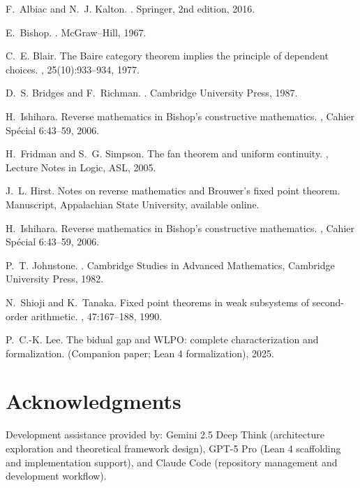 \documentclass[11pt]{article}
\theoremstyle{definition}
\theoremstyle{remark}
\begin{document}
\bigskip


\begin{thebibliography}{10}

F.~Albiac and N.~J. Kalton.
.
\newblock Springer, 2nd edition, 2016.

E.~Bishop.
.
\newblock McGraw--Hill, 1967.

C.~E. Blair.
\newblock The {B}aire category theorem implies the principle of dependent choices.
, 25(10):933--934, 1977.

D.~S. Bridges and F.~Richman.
.
\newblock Cambridge University Press, 1987.

H.~Ishihara.
\newblock Reverse mathematics in {B}ishop's constructive mathematics.
, Cahier Sp\'ecial 6:43--59, 2006.


H.~Fridman and S.~G. Simpson.
\newblock The fan theorem and uniform continuity.
, Lecture Notes in Logic, ASL, 2005.

J.~L. Hirst.
\newblock Notes on reverse mathematics and {B}rouwer's fixed point theorem.
\newblock Manuscript, Appalachian State University, available online.

H.~Ishihara.
\newblock Reverse mathematics in {B}ishop's constructive mathematics.
, Cahier Sp\'ecial 6:43--59, 2006.

P.~T. Johnstone.
.
\newblock Cambridge Studies in Advanced Mathematics, Cambridge University Press, 1982.

N.~Shioji and K.~Tanaka.
\newblock Fixed point theorems in weak subsystems of second-order arithmetic.
, 47:167--188, 1990.

P.~C.-K. Lee.
\newblock The bidual gap and {WLPO}: complete characterization and
  formalization.
\newblock (Companion paper; Lean 4 formalization), 2025.

\end{thebibliography}






\section*{Acknowledgments}
Development assistance provided by: Gemini 2.5 Deep Think (architecture exploration and theoretical framework design), GPT-5 Pro (Lean 4 scaffolding and implementation support), and Claude Code (repository management and development workflow).
\end{document}
